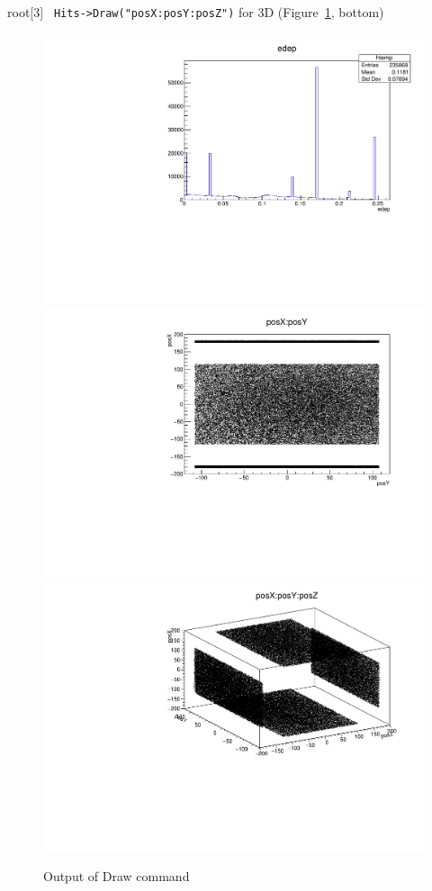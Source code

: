 \documentclass[12pt]{article}
\begin{document}
root[3] \verb| Hits->Draw("posX:posY:posZ")| for 3D (Figure~\ref{fig:1Dhist}, bottom)\\
\begin{figure}[h]
\centering
\includegraphics[scale=0.37]{figs/1Dhist.pdf} \\
\includegraphics[scale=0.37]{figs/2Dhist.pdf} \\
\includegraphics[scale=0.37]{figs/3Dhist.pdf}
\caption{Output of Draw command}
\label{fig:1Dhist}
\end{figure}
\clearpage
\end{document}
